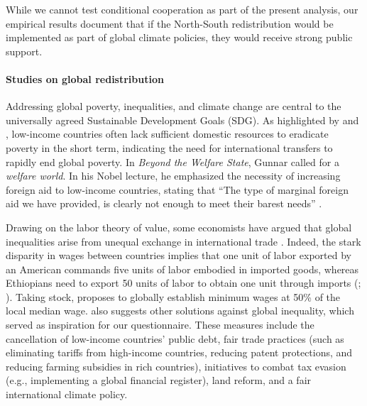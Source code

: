 While we cannot test conditional cooperation as part of the present analysis, our empirical results document that if the North-South redistribution would be implemented as part of global climate policies, they would receive strong public support.

\paragraph{Studies on global redistribution} 
Addressing global poverty, inequalities, and climate change are central to the universally agreed Sustainable Development Goals (SDG). %
As highlighted by  and , low-income countries often lack sufficient domestic resources to eradicate poverty in the short term, indicating the need for international transfers to rapidly end global poverty. %
In \textit{Beyond the Welfare State}, Gunnar  called for a \textit{welfare world}. In his Nobel lecture, he emphasized the necessity of increasing foreign aid to low-income countries, stating that ``The type of marginal foreign aid we have provided, is clearly not enough to meet their barest needs'' .

Drawing on the labor theory of value, some economists have argued that global inequalities arise from unequal exchange in international trade . Indeed, the stark disparity in wages between countries implies that one unit of labor exported by an American commands five units of labor embodied in imported goods, whereas Ethiopians need to export 50 units of labor to obtain one unit through imports (; ).
Taking stock,  proposes to globally establish minimum wages at 50\% of the local median wage.  also suggests other solutions against global inequality, which served as inspiration for our questionnaire. These measures include the cancellation of low-income countries' public debt, fair trade practices (such as eliminating tariffs from high-income countries, reducing patent protections, and reducing farming subsidies in rich countries), initiatives to combat tax evasion (e.g., implementing a global financial register), land reform, and a fair international climate policy. 

